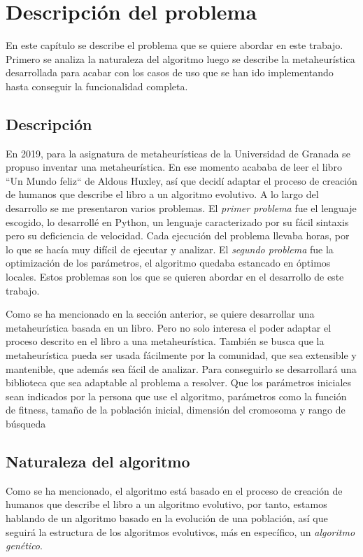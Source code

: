 \chapter{Descripción del problema}

En este capítulo se describe el problema que se quiere abordar en este trabajo. Primero se analiza la naturaleza del algoritmo
luego se describe la metaheurística desarrollada para acabar con los casos de uso que se han ido implementando hasta conseguir la funcionalidad
completa.

\section{Descripción}

En 2019, para la asignatura de metaheurísticas de la Universidad de Granada \cite{merelo_molina_2021} se propuso inventar una metaheurística. En
ese momento acababa de leer el libro ``Un Mundo feliz`` de Aldous Huxley, así que decidí adaptar el proceso de creación 
de humanos que describe el libro a un algoritmo evolutivo. A lo largo del desarrollo se me presentaron varios problemas. El
\textit{primer problema} fue el lenguaje escogido, lo desarrollé en Python, un lenguaje caracterizado por su fácil sintaxis pero su deficiencia de
velocidad. Cada ejecución del problema llevaba horas, por lo que se hacía muy difícil de ejecutar y analizar. El
\textit{segundo problema} fue la optimización de los parámetros, el algoritmo quedaba estancado en óptimos locales. Estos problemas son 
los que se quieren abordar en el desarrollo de este trabajo.

Como se ha mencionado en la sección anterior, se quiere desarrollar una metaheurística basada en un libro. Pero no solo interesa
el poder adaptar el proceso descrito en el libro a una metaheurística. También se busca que la metaheurística pueda ser
usada fácilmente por la comunidad, que sea extensible y mantenible, que además sea fácil de analizar. Para conseguirlo
se desarrollará una biblioteca que sea adaptable al problema a resolver. Que los parámetros iniciales sean 
indicados por la persona que use el algoritmo, parámetros como la función de fitness, tamaño de la población inicial,
dimensión del cromosoma y rango de búsqueda

\section{Naturaleza del algoritmo}

Como se ha mencionado, el algoritmo está basado en el proceso de creación de humanos que describe el libro a un algoritmo evolutivo, 
por tanto, estamos hablando de un algoritmo basado en la evolución de una población, así que seguirá la estructura de los
algoritmos evolutivos, más en específico, un \emph{algoritmo genético}. 

